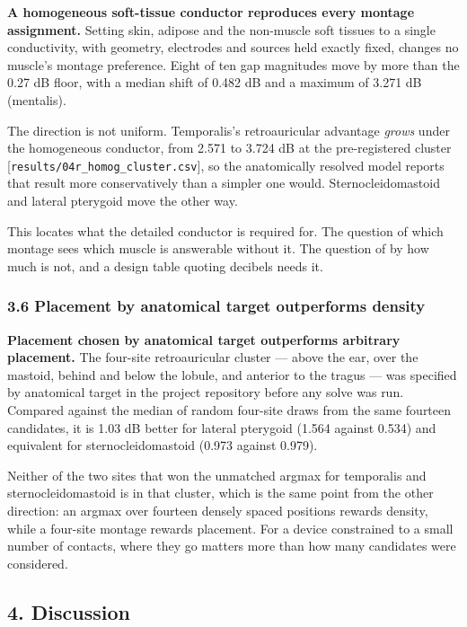 \documentclass[
  11pt,
  letterpaper,
]{article}
\begin{document}
\textbf{A homogeneous soft-tissue conductor reproduces every montage assignment.}
Setting skin, adipose and the non-muscle soft tissues to a single conductivity,
with geometry, electrodes and sources held exactly fixed, changes no muscle's
montage preference. Eight of ten gap magnitudes move by more than the 0.27 dB
floor, with a median shift of 0.482 dB and a maximum of 3.271 dB (mentalis).

The direction is not uniform. Temporalis's retroauricular advantage \emph{grows}
under the homogeneous conductor, from \textminus{}2.571 to \textminus{}3.724 dB at the pre-registered
cluster {[}\texttt{results/04r\_homog\_cluster.csv}{]}, so the anatomically resolved model
reports that result more conservatively than a simpler one would.
Sternocleidomastoid and lateral pterygoid move the other way.

This locates what the detailed conductor is required for. The question of
which montage sees which muscle is answerable without it. The question of by
how much is not, and a design table quoting decibels needs it.

\subsubsection{3.6 Placement by anatomical target outperforms density}\label{placement-by-anatomical-target-outperforms-density}

\textbf{Placement chosen by anatomical target outperforms arbitrary placement.} The
four-site retroauricular cluster --- above the ear, over the mastoid, behind and
below the lobule, and anterior to the tragus --- was specified by anatomical
target in the project repository before any solve was run. Compared against
the median of random four-site draws from the same fourteen candidates, it is
1.03 dB better for lateral pterygoid (\textminus{}1.564 against \textminus{}0.534) and equivalent
for sternocleidomastoid (\textminus{}0.973 against \textminus{}0.979).

Neither of the two sites that won the unmatched argmax for temporalis and
sternocleidomastoid is in that cluster, which is the same point from the other
direction: an argmax over fourteen densely spaced positions rewards density,
while a four-site montage rewards placement. For a device constrained to a
small number of contacts, where they go matters more than how many candidates
were considered.

\subsection{4. Discussion}\label{discussion}
\end{document}
